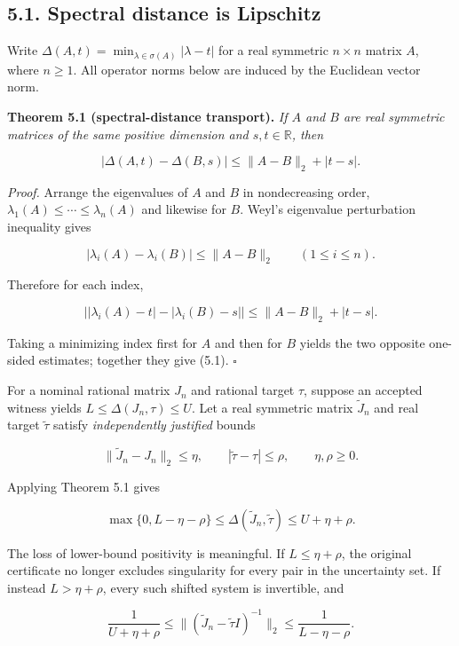 \documentclass[
  11pt,
]{article}
\begin{document}
\subsection{5.1. Spectral distance is
Lipschitz}\label{spectral-distance-is-lipschitz}

Write \(\Delta(A,t)=\min_{\lambda\in\sigma(A)}|\lambda-t|\) for a real
symmetric \(n\times n\) matrix \(A\), where \(n\ge1\). All operator
norms below are induced by the Euclidean vector norm.

\textbf{Theorem 5.1 (spectral-distance transport).} \emph{If \(A\) and
\(B\) are real symmetric matrices of the same positive dimension and
\(s,t\in\mathbb R\), then}

\[
\boxed{
|\Delta(A,t)-\Delta(B,s)|
\le\|A-B\|_2+|t-s|.}
\tag{5.1}
\]

\emph{Proof.} Arrange the eigenvalues of \(A\) and \(B\) in
nondecreasing order, \(\lambda_1(A)\le\cdots\le\lambda_n(A)\) and
likewise for \(B\). Weyl's eigenvalue perturbation inequality gives

\[
|\lambda_i(A)-\lambda_i(B)|\le\|A-B\|_2
\qquad (1\le i\le n).
\]

Therefore for each index,

\[
\bigl||\lambda_i(A)-t|-|\lambda_i(B)-s|\bigr|
\le\|A-B\|_2+|t-s|.
\]

Taking a minimizing index first for \(A\) and then for \(B\) yields the
two opposite one-sided estimates; together they give (5.1). \(\square\)

For a nominal rational matrix \(J_n\) and rational target \(\tau\),
suppose an accepted witness yields \(L\le\Delta(J_n,\tau)\le U\). Let a
real symmetric matrix \(\widetilde J_n\) and real target
\(\widetilde\tau\) satisfy \emph{independently justified} bounds

\[
\|\widetilde J_n-J_n\|_2\le\eta,
\qquad
|\widetilde\tau-\tau|\le\rho,
\qquad \eta,\rho\ge0.
\tag{5.2}
\]

Applying Theorem 5.1 gives

\[
\boxed{
\max\{0,L-\eta-\rho\}
\le\Delta(\widetilde J_n,\widetilde\tau)
\le U+\eta+\rho.}
\tag{5.3}
\]

The loss of lower-bound positivity is meaningful. If \(L\le\eta+\rho\),
the original certificate no longer excludes singularity for every pair
in the uncertainty set. If instead \(L>\eta+\rho\), every such shifted
system is invertible, and

\[
\frac1{U+\eta+\rho}
\le
\|(\widetilde J_n-\widetilde\tau I)^{-1}\|_2
\le
\frac1{L-\eta-\rho}.
\tag{5.4}
\]
\end{document}

